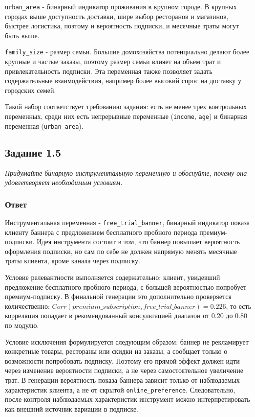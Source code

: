 \documentclass[11pt]{article}
\newenvironment{tasktext}
      {\begin{tcolorbox}[breakable, colback=black!3, colframe=black!28,
        boxrule=0.4pt, arc=1.5mm, left=7pt, right=7pt, top=5pt, bottom=5pt,
        before skip=0.35em, after skip=0.75em]\itshape}
      {\end{tcolorbox}}
\begin{document}
\texttt{urban\_area} - бинарный индикатор проживания в крупном городе. В
крупных городах выше доступность доставки, шире выбор ресторанов и
магазинов, быстрее логистика, поэтому и вероятность подписки, и месячные
траты могут быть выше.

\texttt{family\_size} - размер семьи. Большие домохозяйства потенциально
делают более крупные и частые заказы, поэтому размер семьи влияет на
объем трат и привлекательность подписки. Эта переменная также позволяет
задать содержательные взаимодействия, например более высокий спрос на
доставку у городских семей.

Такой набор соответствует требованию задания: есть не менее трех
контрольных переменных, среди них есть непрерывные переменные
(\texttt{income}, \texttt{age}) и бинарная переменная
(\texttt{urban\_area}).

\subsection{Задание 1.5}\label{ux437ux430ux434ux430ux43dux438ux435-1.5}

\begin{tasktext}
Придумайте бинарную инструментальную переменную и обоснуйте, почему она
удовлетворяет необходимым условиям.
\end{tasktext}

\subsubsection{Ответ}\label{ux43eux442ux432ux435ux442-4}

Инструментальная переменная - \texttt{free\_trial\_banner}, бинарный
индикатор показа клиенту баннера с предложением бесплатного пробного
периода премиум-подписки. Идея инструмента состоит в том, что баннер
повышает вероятность оформления подписки, но сам по себе не должен
напрямую менять месячные траты клиента, кроме канала через подписку.

Условие релевантности выполняется содержательно: клиент, увидевший
предложение бесплатного пробного периода, с большей вероятностью
попробует премиум-подписку. В финальной генерации это дополнительно
проверяется количественно:
\(Corr(premium\_subscription, free\_trial\_banner) = 0.226\), то есть
корреляция попадает в рекомендованный консультацией диапазон от 0.20 до
0.80 по модулю.

Условие исключения формулируется следующим образом: баннер не
рекламирует конкретные товары, рестораны или скидки на заказы, а
сообщает только о возможности попробовать подписку. Поэтому его прямой
эффект должен идти через изменение вероятности подписки, а не через
самостоятельное увеличение трат. В генерации вероятность показа баннера
зависит только от наблюдаемых характеристик клиента, а не от скрытой
\texttt{online\_preference}. Следовательно, после контроля наблюдаемых
характеристик инструмент можно интерпретировать как внешний источник
вариации в подписке.
\end{document}
